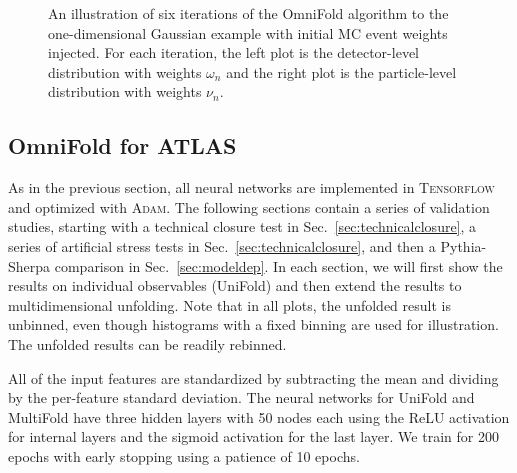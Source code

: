 \documentclass[NOTE, atlasdraft=true, texlive=2016, UKenglish]{\ATLASLATEXPATH atlasdoc}
\begin{document}
\begin{figure}[h!]
\caption{An illustration of six iterations of the OmniFold algorithm to the one-dimensional Gaussian example with initial MC event weights injected.  For each iteration, the left plot is the detector-level distribution with weights $\omega_n$ and the right plot is the particle-level distribution with weights $\nu_n$.}
\label{fig:gaussian:MCiterations}
\end{figure}

\clearpage

\subsection{OmniFold for ATLAS}

As in the previous section, all neural networks are implemented in \textsc{Tensorflow} and optimized with \textsc{Adam}.  The following sections contain a series of validation studies, starting with a technical closure test in Sec.~\ref{sec:technicalclosure}, a series of artificial stress tests in Sec.~\ref{sec:technicalclosure}, and then a Pythia-Sherpa comparison in Sec.~\ref{sec:modeldep}.  In each section, we will first show the results on individual observables (UniFold) and then extend the results to multidimensional unfolding.  Note that in all plots, the unfolded result is unbinned, even though histograms with a fixed binning are used for illustration.  The unfolded results can be readily rebinned.

All of the input features are standardized by subtracting the mean and dividing by the per-feature standard deviation.  The neural networks for UniFold and MultiFold have three hidden layers with 50 nodes each using the ReLU activation for internal layers and the sigmoid activation for the last layer.  We train for 200 epochs with early stopping using a patience of 10 epochs.
\end{document}
